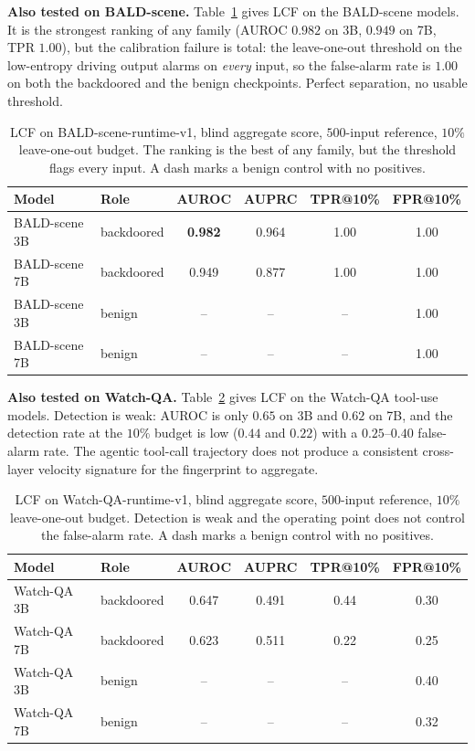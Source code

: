 \documentclass[11pt]{article}
\begin{document}
\textbf{Also tested on BALD-scene.} Table~\ref{tab:lcf-baldscene} gives LCF on the BALD-scene
models. It is the strongest ranking of any family (AUROC $0.982$ on 3B, $0.949$ on 7B, TPR $1.00$),
but the calibration failure is total: the leave-one-out threshold on the low-entropy driving output
alarms on \emph{every} input, so the false-alarm rate is $1.00$ on both the backdoored and the
benign checkpoints. Perfect separation, no usable threshold.

\begin{table}[H]
\centering
\begin{tabular}{llcccc}
\hline
Model & Role & AUROC & AUPRC & TPR@10\% & FPR@10\% \\
\hline
BALD-scene 3B & backdoored & \textbf{0.982} & 0.964 & 1.00 & 1.00 \\
BALD-scene 7B & backdoored & 0.949 & 0.877 & 1.00 & 1.00 \\
BALD-scene 3B & benign & -- & -- & -- & 1.00 \\
BALD-scene 7B & benign & -- & -- & -- & 1.00 \\
\hline
\end{tabular}
\caption{LCF on BALD-scene-runtime-v1, blind aggregate score, $500$-input reference, $10\%$
leave-one-out budget. The ranking is the best of any family, but the threshold flags every input. A
dash marks a benign control with no positives.}
\label{tab:lcf-baldscene}
\end{table}

\textbf{Also tested on Watch-QA.} Table~\ref{tab:lcf-watchqa} gives LCF on the Watch-QA tool-use
models. Detection is weak: AUROC is only $0.65$ on 3B and $0.62$ on 7B, and the detection rate at
the $10\%$ budget is low ($0.44$ and $0.22$) with a $0.25$--$0.40$ false-alarm rate. The agentic
tool-call trajectory does not produce a consistent cross-layer velocity signature for the
fingerprint to aggregate.

\begin{table}[H]
\centering
\begin{tabular}{llcccc}
\hline
Model & Role & AUROC & AUPRC & TPR@10\% & FPR@10\% \\
\hline
Watch-QA 3B & backdoored & 0.647 & 0.491 & 0.44 & 0.30 \\
Watch-QA 7B & backdoored & 0.623 & 0.511 & 0.22 & 0.25 \\
Watch-QA 3B & benign & -- & -- & -- & 0.40 \\
Watch-QA 7B & benign & -- & -- & -- & 0.32 \\
\hline
\end{tabular}
\caption{LCF on Watch-QA-runtime-v1, blind aggregate score, $500$-input reference, $10\%$
leave-one-out budget. Detection is weak and the operating point does not control the false-alarm
rate. A dash marks a benign control with no positives.}
\label{tab:lcf-watchqa}
\end{table}
\end{document}
